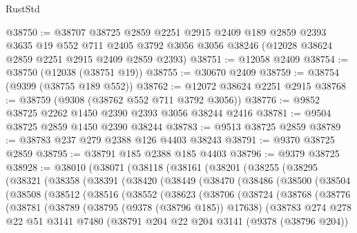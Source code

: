 \begin{lexlean}{RustStd}
\begin{coremodule}
@38750 := @38707
    @38725
    @2859
    @2251
    @2915
    @2409
    @189
    @2859
    @2393
    @3635
    @19
    @552
    @711
    @2405
    @3792
    @3056
    @3056
    @38246
    (@12028 @38624 @2859 @2251 @2915 @2409 @2859 @2393)
@38751 := @12058 @2409
@38754 := @38750 (@12038 (@38751 @19))
@38755 := @30670 @2409
@38759 := @38754 (@9399 (@38755 @189 @552))
@38762 := @12072 @38624 @2251 @2915
@38768 := @38759 (@9308 (@38762 @552 @711 @3792 @3056))
@38776 := @9852 @38725 @2262 @1450 @2390 @2393 @3056 @38244 @2416
@38781 := @9504 @38725 @2859 @1450 @2390 @38244
@38783 := @9513 @38725 @2859
@38789 := @38783 @237 @279 @2388 @126 @4403 @38243
@38791 := @9370 @38725 @2859
@38795 := @38791 @185 @2388 @185 @4403
@38796 := @9379 @38725
@38928 := @38010
    (@38071
      (@38118
        (@38161
          (@38201
            (@38255
              (@38295
                (@38321
                  (@38358
                    (@38391
                      (@38420
                        (@38449
                          (@38470
                            (@38486
                              (@38500
                                (@38504
                                  (@38508
                                    (@38512
                                      (@38516
                                        (@38552
                                          (@38623
                                            (@38706
                                              (@38724
                                                (@38768
                                                  (@38776
                                                    (@38781
                                                      (@38789
                                                        (@38795 (@9378 (@38796 @185)) @17638)
                                                        (@38783
                                                          @274
                                                          @278
                                                          @22
                                                          @51
                                                          @3141
                                                          @7480
                                                          (@38791
                                                            @204
                                                            @22
                                                            @204
                                                            @3141
                                                            (@9378 (@38796 @204))

\end{coremodule}
\end{lexlean}
